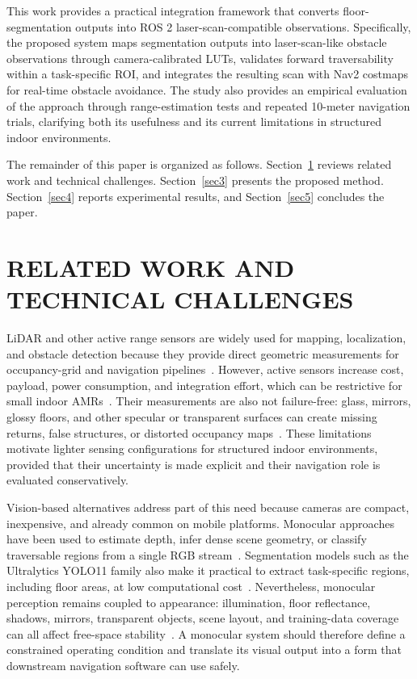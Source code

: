 \documentclass{IJCAS}
\begin{document}
This work provides a practical integration framework that converts floor-segmentation outputs into ROS 2 laser-scan-compatible observations. Specifically, the proposed system maps segmentation outputs into laser-scan-like obstacle observations through camera-calibrated LUTs, validates forward traversability within a task-specific ROI, and integrates the resulting scan with Nav2 costmaps for real-time obstacle avoidance. The study also provides an empirical evaluation of the approach through range-estimation tests and repeated 10-meter navigation trials, clarifying both its usefulness and its current limitations in structured indoor environments.

The remainder of this paper is organized as follows. Section~\ref{sec2} reviews related work and technical challenges. Section~\ref{sec3} presents the proposed method. Section~\ref{sec4} reports experimental results, and Section~\ref{sec5} concludes the paper.

\section{RELATED WORK AND TECHNICAL CHALLENGES}\label{sec2}

LiDAR and other active range sensors are widely used for mapping, localization, and obstacle detection because they provide direct geometric measurements for occupancy-grid and navigation pipelines~\cite{li_2020_lidar,yusuf_2022_iotbased,liu_2024_a}. However, active sensors increase cost, payload, power consumption, and integration effort, which can be restrictive for small indoor AMRs~\cite{gvrnextgenerationtechnologiesresearchteam_2026_autonomous,liu_2024_a}. Their measurements are also not failure-free: glass, mirrors, glossy floors, and other specular or transparent surfaces can create missing returns, false structures, or distorted occupancy maps~\cite{deepthadamodaran_2023_experimental,yang_2011_on,wang_2017_detecting,tibebu_2021_lidarbased}. These limitations motivate lighter sensing configurations for structured indoor environments, provided that their uncertainty is made explicit and their navigation role is evaluated conservatively.

Vision-based alternatives address part of this need because cameras are compact, inexpensive, and already common on mobile platforms. Monocular approaches have been used to estimate depth, infer dense scene geometry, or classify traversable regions from a single RGB stream~\cite{shariqfarooqbhat_2021_adabins,ranftl_2021_vision,wang_2021_a,dang_2023_obstacle}. Segmentation models such as the Ultralytics YOLO11 family also make it practical to extract task-specific regions, including floor areas, at low computational cost~\cite{ultralytics_2024_ultralytics}. Nevertheless, monocular perception remains coupled to appearance: illumination, floor reflectance, shadows, mirrors, transparent objects, scene layout, and training-data coverage can all affect free-space stability~\cite{mei_2021_depthaware,sajjan_2020_clear,deepthadamodaran_2023_experimental,singh_2019_multidata}. A monocular system should therefore define a constrained operating condition and translate its visual output into a form that downstream navigation software can use safely.
\end{document}
